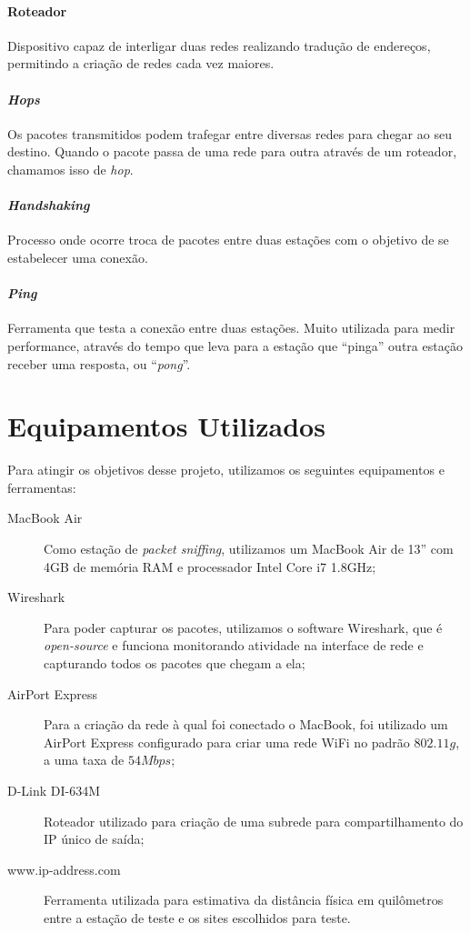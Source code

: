 \documentclass[12pt,a4paper]{report}
\begin{document}
\paragraph{Roteador} Dispositivo capaz de interligar duas redes realizando tradução de endereços, permitindo a criação de redes cada vez maiores.

\paragraph{\textit{Hops}} Os pacotes transmitidos podem trafegar entre diversas redes para chegar ao seu destino. Quando o pacote passa de uma rede para outra através de um roteador, chamamos isso de \textit{hop}.

\paragraph{\textit{Handshaking}} Processo onde ocorre troca de pacotes entre duas estações com o objetivo de se estabelecer uma conexão.

\paragraph{\textit{Ping}} Ferramenta que testa a conexão entre duas estações. Muito utilizada para medir performance, através do tempo que leva para a estação que ``pinga'' outra estação receber uma resposta, ou ``\textit{pong}''.

\section{Equipamentos Utilizados}

Para atingir os objetivos desse projeto, utilizamos os seguintes equipamentos e ferramentas:

\begin{description}
\item[MacBook Air] Como estação de \textit{packet sniffing}, utilizamos um MacBook Air de 13'' com 4GB de memória RAM e processador Intel Core i7 1.8GHz;
\item[Wireshark] Para poder capturar os pacotes, utilizamos o software Wireshark, que é \textit{open-source} e funciona monitorando atividade na interface de rede e capturando todos os pacotes que chegam a ela;
\item[AirPort Express] Para a criação da rede à qual foi conectado o MacBook, foi utilizado um AirPort Express configurado para criar uma rede WiFi no padrão \(802.11g\), a uma taxa de \(54Mbps\);
\item[D-Link DI-634M] Roteador utilizado para criação de uma subrede para compartilhamento do IP único de saída;
\item[www.ip-address.com] Ferramenta utilizada para estimativa da distância física em quilômetros entre a estação de teste e os sites escolhidos para teste.
\end{description}
\end{document}
